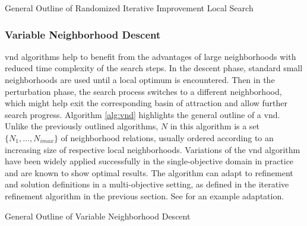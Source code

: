  \begin{algorithm}
  \caption{General Outline of Randomized Iterative Improvement Local Search}\label{alg:randomized-iterative-improvement}
  \end{algorithm}



\subsubsection{Variable Neighborhood Descent}
\Gls{vnd} algorithms help to benefit from the advantages of large neighborhoods with reduced time complexity of the search steps. In the descent phase, standard small neighborhoods are used until a local optimum is encountered. Then in the perturbation phase, the search process switches to a different neighborhood, which might help exit the corresponding basin of attraction and allow further search progress. Algorithm \ref{alg:vnd} highlights the general outline of a \gls{vnd}. Unlike the previously outlined algorithms, $N$ in this algorithm is a set $\{N_1,..., N_{imax}\}$ of neighborhood relations, usually ordered according to an increasing size of respective local neighborhoods. Variations of the \gls{vnd} algorithm have been widely applied successfully in the single-objective domain in practice and are known to show optimal results. The algorithm can adapt to refinement and solution definitions in a multi-objective setting, as defined in the iterative refinement algorithm in the previous section. See \parencite{Duarte2015Multi-objectiveProblems} for an example adaptation.

\begin{algorithm}
  \caption{General Outline of Variable Neighborhood Descent}\label{alg:vnd}
  \end{algorithm}

